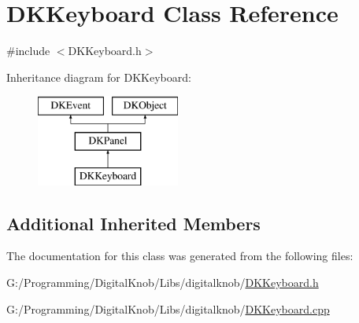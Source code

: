 \hypertarget{class_d_k_keyboard}{\section{D\-K\-Keyboard Class Reference}
\label{class_d_k_keyboard}
}


{\ttfamily \#include $<$D\-K\-Keyboard.\-h$>$}

Inheritance diagram for D\-K\-Keyboard\-:\begin{figure}[H]
\begin{center}
\leavevmode
\includegraphics[height=3.000000cm]{class_d_k_keyboard}
\end{center}
\end{figure}
\subsection*{Additional Inherited Members}


The documentation for this class was generated from the following files\-:\begin{DoxyCompactItemize}
\item 
G\-:/\-Programming/\-Digital\-Knob/\-Libs/digitalknob/\hyperlink{_d_k_keyboard_8h}{D\-K\-Keyboard.\-h}\item 
G\-:/\-Programming/\-Digital\-Knob/\-Libs/digitalknob/\hyperlink{_d_k_keyboard_8cpp}{D\-K\-Keyboard.\-cpp}\end{DoxyCompactItemize}
